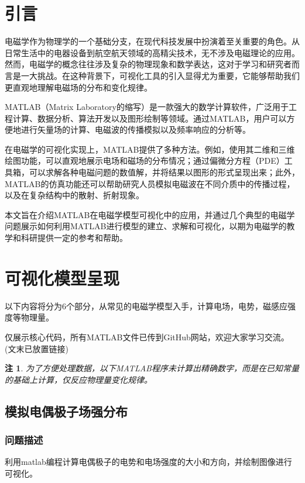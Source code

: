 \documentclass[UTF8]{article}
\numberwithin{figure}{subsection}
\numberwithin{table}{subsection}
\newtheorem{remark}{\indent 注}[subsection]
\begin{document}
\begin{multicols}{2}
    \section{引言}
    \par 电磁学作为物理学的一个基础分支，在现代科技发展中扮演着至关重要的角色。从日常生活中的电器设备到航空航天领域的高精尖技术，无不涉及电磁理论的应用。然而，电磁学的概念往往涉及复杂的物理现象和数学表达，这对于学习和研究者而言是一大挑战。在这种背景下，可视化工具的引入显得尤为重要，它能够帮助我们更直观地理解电磁场的分布和变化规律。
    \par MATLAB（Matrix Laboratory的缩写）是一款强大的数学计算软件，广泛用于工程计算、数据分析、算法开发以及图形绘制等领域。通过MATLAB，用户可以方便地进行矢量场的计算、电磁波的传播模拟以及频率响应的分析等。
    \par 在电磁学的可视化实现上，MATLAB提供了多种方法。例如，使用其二维和三维绘图功能，可以直观地展示电场和磁场的分布情况；通过偏微分方程（PDE）工具箱，可以求解各种电磁问题的数值解，并将结果以图形的形式呈现出来；此外，MATLAB的仿真功能还可以帮助研究人员模拟电磁波在不同介质中的传播过程，以及在复杂结构中的散射、折射现象。
    \par 本文旨在介绍MATLAB在电磁学模型可视化中的应用，并通过几个典型的电磁学问题展示如何利用MATLAB进行模型的建立、求解和可视化，以期为电磁学的教学和科研提供一定的参考和帮助。
    
    \section{可视化模型呈现}
    \par 以下内容将分为6个部分，从常见的电磁学模型入手，计算电场，电势，磁感应强度等物理量。
    \par 仅展示核心代码，所有MATLAB文件已传到GitHub网站，欢迎大家学习交流。(文末已放置链接)
    \begin{remark}为了方便处理数据，以下MATLAB程序未计算出精确数字，而是在已知常量的基础上计算，仅反应物理量变化规律。
    \end{remark}
    \subsection{模拟电偶极子场强分布}
    \subsubsection{问题描述}
    \par 利用matlab编程计算电偶极子的电势和电场强度的大小和方向，并绘制图像进行可视化。

\end{multicols}
\end{document}
